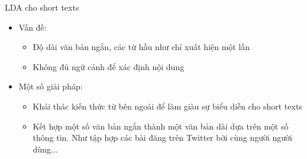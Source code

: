 \documentclass[pdf]{beamer}
\begin{document}
\begin{frame}{LDA cho short texts}
	\begin{itemize}
		\item Vấn đề: 
		\begin{itemize}
			\item Độ dài văn bản ngắn, các từ hầu như chỉ xuất hiện một lần
			\item Không đủ ngữ cảnh để xác định nội dung
		\end{itemize}
	\end{itemize}		
	\begin{itemize}
		\item Một số giải pháp:
		\begin{itemize}
			\item Khái thác kiến thức từ bên ngoài để làm giàu sự biểu diễn cho short texts
			\item Kết hợp một số văn bản ngắn thành một văn bản dài dựa trên một số thông tin. Như tập hợp các bài đăng trên Twitter bời cùng người người dùng...
		\end{itemize}
	\end{itemize}
\end{frame}
\end{document}
